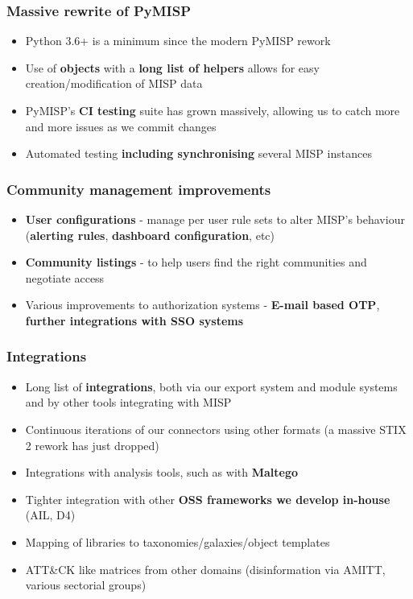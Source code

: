 \begin{frame}
\frametitle{Massive rewrite of PyMISP}
\begin{itemize}
	\item Python 3.6+ is a minimum since the modern PyMISP rework
        \item Use of {\bf objects} with a {\bf long list of helpers} allows for easy creation/modification of MISP data
        \item PyMISP's {\bf CI testing} suite has grown massively, allowing us to catch more and more issues as we commit changes
        \item Automated testing {\bf including synchronising} several MISP instances
\end{itemize}
\end{frame}

\begin{frame}
\frametitle{Community management improvements}
\begin{itemize}
	\item {\bf User configurations} - manage per user rule sets to alter MISP's behaviour ({\bf alerting rules}, {\bf dashboard configuration}, etc)
        \item {\bf Community listings} - to help users find the right communities and negotiate access
        \item Various improvements to authorization systems - {\bf E-mail based OTP}, {\bf further integrations with SSO systems}
\end{itemize}
\end{frame}

\begin{frame}
\frametitle{Integrations}
\begin{itemize}
	\item Long list of {\bf integrations}, both via our export system and module systems and by other tools integrating with MISP
        \item Continuous iterations of our connectors using other formats (a massive STIX 2 rework has just dropped)
        \item Integrations with analysis tools, such as with {\bf Maltego}
        \item Tighter integration with other {\bf OSS frameworks we develop in-house} (AIL, D4)
        \item Mapping of libraries to taxonomies/galaxies/object templates
        \item ATT\&CK like matrices from other domains (disinformation via AMITT, various sectorial groups)
\end{itemize}
\end{frame}

